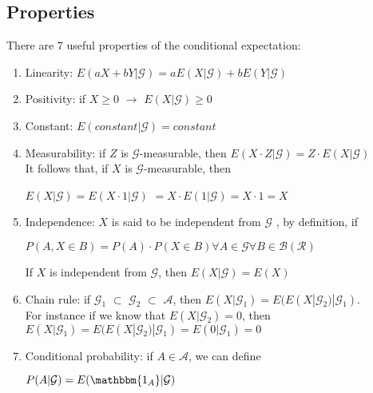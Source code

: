 \subsection{Properties}
There are 7 useful properties of the conditional expectation:
\begin{enumerate}
    \item Linearity: $E(aX + bY | \mathcal{G}) = aE(X|\mathcal{G})+bE(Y|\mathcal{G})$
    \item Positivity: if $X \geq 0$ $\rightarrow$ $E(X|\mathcal{G}) \geq 0$ 
    \item Constant: $E(constant | \mathcal{G}) = constant$ 
    \item Measurability: if $Z$ is $\mathcal{G}$-measurable, then $E(X\cdot Z| \mathcal{G}) = Z \cdot E(X | \mathcal{G})$ \\
It follows that, if $X$ is $\mathcal{G}$-measurable, then
\begin{center}
    $E(X|\mathcal{G}) = E(X\cdot 1 | \mathcal{G})$ $= X \cdot E(1 | \mathcal{G}) = X \cdot 1 = X$ 
\end{center}
    \item Independence: $X$ is said to be independent from $\mathcal{G}$ , by definition, if
\begin{center}
    $P(A, X \in B) = P(A) \cdot P(X \in B) \forall A \in \mathcal{G} \forall B \in \mathcal{B}(\mathcal{R})$ 
\end{center} 
If $X$ is independent from $\mathcal{G}$, then $E(X|\mathcal{G}) = E(X)$
    \item Chain rule: if $\mathcal{G_1}$ $\subset$ $\mathcal{G_2}$ $\subset$ $\mathcal{A}$, then $E(X | \mathcal{G_1}) = E(E(X|\mathcal{G_2}) |\mathcal{G_1})$.\\
    For instance if we know that $E(X|\mathcal{G_2})=0$, then\\
    $E(X|\mathcal{G_1}) = E(E(X|\mathcal{G_2})|\mathcal{G_1}) = E(0 | \mathcal{G_1})=0$ 
    \item Conditional probability: if $A \in \mathcal{A}$, we can define 
    \begin{center}
        $P(A|\mathcal{G}) = E(\mathbbm{1_A}|\mathcal{G})$ 
    \end{center}
\end{enumerate}

